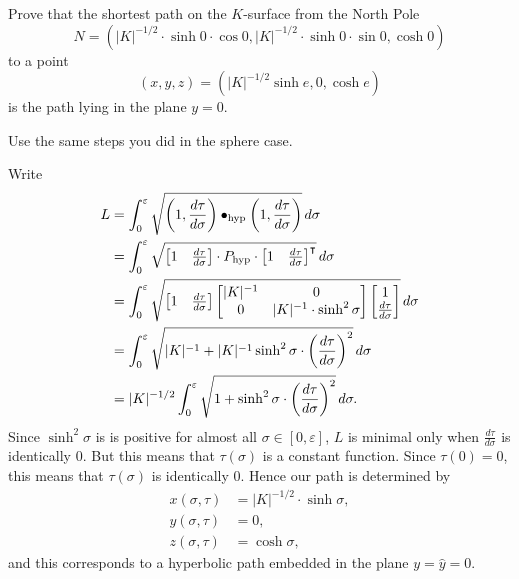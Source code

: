 \documentclass[newpage,hints,handout]{ximera}
\begin{document}
\begin{problem}
  Prove that the shortest path on the $K$-surface from the North Pole
  \[
  N=\left( |K|^{-1/2}\cdot \sinh 0\cdot  \cos 0,|K|^{-1/2}\cdot \sinh  0\cdot \sin 0,\cosh
  0\right)
  \]
  to a point
  \[
  (x,y,z)=\left(|K|^{-1/2}\sinh e,0,\cosh e\right)
  \]
  is the path lying in the plane $y=0$.
  \begin{hint}
    Use the same steps you did in the sphere case.
  \end{hint}

  \begin{freeResponse}
    Write
    \begin{align*}
    L  &=\int_{0}^{\varepsilon} \sqrt{\left(1,\dd[\tau]{\sigma}\right)\bullet_\mathrm{hyp} \left(1,\dd[\tau]{\sigma}\right)}\d\sigma\\
    &= \int_{0}^{\varepsilon} \sqrt{
      \begin{bmatrix} 1 & \dd[\tau]{\sigma}
      \end{bmatrix} \cdot P_\mathrm{hyp}\cdot
      \begin{bmatrix} 1 & \dd[\tau]{\sigma}
      \end{bmatrix}^\transpose}\d\sigma \\
    &= \int_{0}^{\varepsilon} \sqrt{
      \begin{bmatrix} 1 & \dd[\tau]{\sigma}
      \end{bmatrix}
      \begin{bmatrix}
        |K|^{-1} & 0 \\
        0 & |K|^{-1}\cdot\sinh^2 \sigma
      \end{bmatrix}
      \begin{bmatrix} 1 \\ \dd[\tau]{\sigma}
    \end{bmatrix}}\d\sigma \\
    &= \int_{0}^{\varepsilon} \sqrt{
      |K|^{-1}+|K|^{-1}\sinh^{2}\sigma\cdot \left(\frac{d\tau }{d\sigma}\right)^{2}
    }\d\sigma \\
    &= |K|^{-1/2}\int_{0}^{\varepsilon} \sqrt{
      1+\sinh^{2}\sigma\cdot \left(\frac{d\tau }{d\sigma}\right)^{2}
    }\d\sigma.
    \end{align*}
   Since $\sinh^{2}\sigma$ is is positive for almost all $\sigma\in[
     0,\varepsilon] $, $L$ is minimal only when
   $\frac{d\tau}{d\sigma}$ is identically $0$. But this means that
   $\tau\left( \sigma\right) $ is a constant function. Since
   $\tau\left( 0\right) =0$, this means that $\tau\left( \sigma\right)
   $ is identically $0$. Hence our path is determined by
   \begin{align*}
     x(\sigma,\tau) &=|K|^{-1/2}\cdot \sinh\sigma,\\
     y(\sigma,\tau) &=0,\\
     z(\sigma,\tau) &=\cosh \sigma,
   \end{align*}
   and this corresponds to a hyperbolic path embedded in the plane
   $y=\hat{y}=0$.
  \end{freeResponse}

\end{problem}
\end{document}
